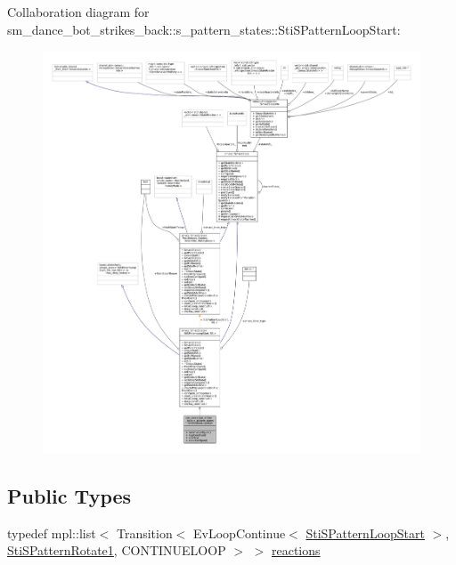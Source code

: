 Collaboration diagram for sm\+\_\+dance\+\_\+bot\+\_\+strikes\+\_\+back\+:\+:s\+\_\+pattern\+\_\+states\+:\+:Sti\+S\+Pattern\+Loop\+Start\+:
\nopagebreak
\begin{figure}[H]
\begin{center}
\leavevmode
\includegraphics[width=350pt]{structsm__dance__bot__strikes__back_1_1s__pattern__states_1_1StiSPatternLoopStart__coll__graph}
\end{center}
\end{figure}
\subsection*{Public Types}
\begin{DoxyCompactItemize}
\item 
typedef mpl\+::list$<$ Transition$<$ Ev\+Loop\+Continue$<$ \hyperlink{structsm__dance__bot__strikes__back_1_1s__pattern__states_1_1StiSPatternLoopStart}{Sti\+S\+Pattern\+Loop\+Start} $>$, \hyperlink{structsm__dance__bot__strikes__back_1_1s__pattern__states_1_1StiSPatternRotate1}{Sti\+S\+Pattern\+Rotate1}, C\+O\+N\+T\+I\+N\+U\+E\+L\+O\+OP $>$ $>$ \hyperlink{structsm__dance__bot__strikes__back_1_1s__pattern__states_1_1StiSPatternLoopStart_a85624f13ac43acd4b5778110aca7ccf1}{reactions}
\end{DoxyCompactItemize}
